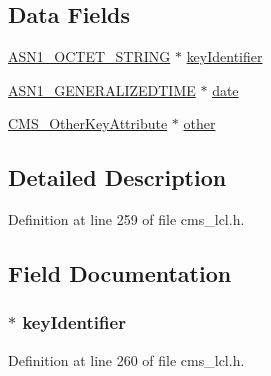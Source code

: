 \subsection*{Data Fields}
\begin{DoxyCompactItemize}
\item 
\hyperlink{crypto_2ossl__typ_8h_afbd05e94e0f0430a2b729473efec88c1}{A\+S\+N1\+\_\+\+O\+C\+T\+E\+T\+\_\+\+S\+T\+R\+I\+NG} $\ast$ \hyperlink{struct_c_m_s___k_e_k_identifier__st_acbea30debe79e1507fef06ad3c5b4d59}{key\+Identifier}
\item 
\hyperlink{crypto_2ossl__typ_8h_abd19ea5b527807ce3a516e6a41440f84}{A\+S\+N1\+\_\+\+G\+E\+N\+E\+R\+A\+L\+I\+Z\+E\+D\+T\+I\+ME} $\ast$ \hyperlink{struct_c_m_s___k_e_k_identifier__st_a8dac4347fb9055f16f81837db490d51a}{date}
\item 
\hyperlink{crypto_2cms_2cms_8h_af54d24ab3b9acdc97b67988d660ede75}{C\+M\+S\+\_\+\+Other\+Key\+Attribute} $\ast$ \hyperlink{struct_c_m_s___k_e_k_identifier__st_a75d0a1d8882aba95c23c4e0e11debc48}{other}
\end{DoxyCompactItemize}


\subsection{Detailed Description}


Definition at line 259 of file cms\+\_\+lcl.\+h.



\subsection{Field Documentation}
\subsubsection[{\texorpdfstring{key\+Identifier}{keyIdentifier}}]{$\ast$ key\+Identifier}\hypertarget{struct_c_m_s___k_e_k_identifier__st_acbea30debe79e1507fef06ad3c5b4d59}{}\label{struct_c_m_s___k_e_k_identifier__st_acbea30debe79e1507fef06ad3c5b4d59}


Definition at line 260 of file cms\+\_\+lcl.\+h.

